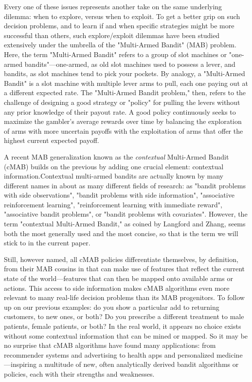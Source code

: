 \documentclass[nojss]{jss}\usepackage[]{graphicx}\usepackage[]{color}
\begin{document}
Every one of these issues represents another take on the same underlying dilemma: when to explore, versus when to exploit. To get a better grip on such decision problems, and to learn if and when specific strategies might be more successful than others, such explore/exploit dilemmas have been studied extensively under the umbrella of the "Multi-Armed Bandit" (MAB) problem.
Here, the term "Multi-Armed Bandit" refers to a group of slot machines or "one-armed bandits"---one-armed, as old slot machines used to possess a lever, and bandits, as slot machines tend to pick your pockets.  By analogy, a "Multi-Armed Bandit" is a slot machine with multiple lever arms to pull, each one paying out at a different expected rate. The "Multi-Armed Bandit problem," then, refers to the challenge of designing a good strategy or "policy" for pulling the levers without any prior knowledge of their payout rate. A good policy continuously seeks to maximize the gambler's average rewards over time by balancing the exploration of arms with more uncertain payoffs with the exploitation of arms that offer the highest current expected payoff.

A recent MAB generalization known as the \textit{contextual} Multi-Armed Bandit (cMAB) builds on the previous by adding one crucial element: contextual information.Contextual multi-armed bandits are actually known by many different names in about as many different fields of research: as "bandit problems with side observations", "bandit problems with side information", "associative reinforcement learning", "reinforcement learning with immediate reward", "associative bandit problems", or "bandit problems with covariates". However, the term "contextual Multi-Armed Bandit," as coined by Langford and Zhang, seems both the most generally used and the most concise, so that is the term we will stick to in the current paper.

Still, however named, all cMAB policies differentiate themselves, by definition, from their MAB cousins in that can make use of features that reflect the current state of the world---features that can then be mapped onto available arms or actions. This access to side information makes cMAB algorithms even more relevant to many real-life decision problems than its MAB progenitors. To follow up on our previous examples: do you show a particular add to returning customers, to new ones, or both? Do you prescribe a different treatment to male patients, female patients, or both? In the real world, it appears no choice exists without some contextual information that can be mined or mapped. So it may be no surprise that cMAB algorithms have found many applications: from recommender systems and advertising to health apps and personalized medicine---inspiring a multitude of new, often analytically derived bandit algorithms or policies, each with their strengths and weaknesses.
\end{document}
